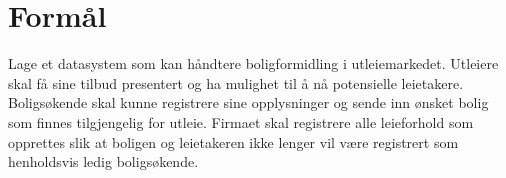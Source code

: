 \section{Formål}
Lage et datasystem som kan håndtere boligformidling i utleiemarkedet. Utleiere skal få sine tilbud presentert og ha mulighet til å nå potensielle leietakere. Boligsøkende skal kunne registrere sine opplysninger og sende inn ønsket bolig som finnes tilgjengelig for utleie. Firmaet skal registrere alle leieforhold som opprettes slik at boligen og leietakeren ikke lenger vil være registrert som henholdsvis ledig boligsøkende. 
